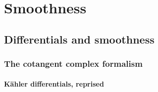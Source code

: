 \chapter{Smoothness} \label{chapter: smoothness}
    \begin{abstract}
        
    \end{abstract}
    
    \minitoc
    
    \section{Differentials and smoothness}
        \subsection{The cotangent complex formalism}
            \subsubsection{K\"ahler differentials, reprised} \label{subsubsection: kahler_differentials}
